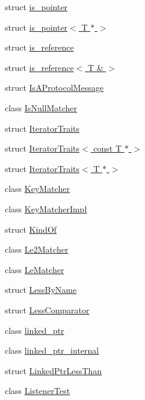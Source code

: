 \begin{DoxyCompactItemize}
struct \hyperlink{structtesting_1_1internal_1_1is__pointer}{is\+\_\+pointer}
\item 
struct \hyperlink{structtesting_1_1internal_1_1is__pointer_3_01_t_01_5_01_4}{is\+\_\+pointer$<$ T $\ast$ $>$}
\item 
struct \hyperlink{structtesting_1_1internal_1_1is__reference}{is\+\_\+reference}
\item 
struct \hyperlink{structtesting_1_1internal_1_1is__reference_3_01_t_01_6_01_4}{is\+\_\+reference$<$ T \& $>$}
\item 
struct \hyperlink{structtesting_1_1internal_1_1_is_a_protocol_message}{Is\+A\+Protocol\+Message}
\item 
class \hyperlink{classtesting_1_1internal_1_1_is_null_matcher}{Is\+Null\+Matcher}
\item 
struct \hyperlink{structtesting_1_1internal_1_1_iterator_traits}{Iterator\+Traits}
\item 
struct \hyperlink{structtesting_1_1internal_1_1_iterator_traits_3_01const_01_t_01_5_01_4}{Iterator\+Traits$<$ const T $\ast$ $>$}
\item 
struct \hyperlink{structtesting_1_1internal_1_1_iterator_traits_3_01_t_01_5_01_4}{Iterator\+Traits$<$ T $\ast$ $>$}
\item 
class \hyperlink{classtesting_1_1internal_1_1_key_matcher}{Key\+Matcher}
\item 
class \hyperlink{classtesting_1_1internal_1_1_key_matcher_impl}{Key\+Matcher\+Impl}
\item 
struct \hyperlink{structtesting_1_1internal_1_1_kind_of}{Kind\+Of}
\item 
class \hyperlink{classtesting_1_1internal_1_1_le2_matcher}{Le2\+Matcher}
\item 
class \hyperlink{classtesting_1_1internal_1_1_le_matcher}{Le\+Matcher}
\item 
struct \hyperlink{structtesting_1_1internal_1_1_less_by_name}{Less\+By\+Name}
\item 
struct \hyperlink{structtesting_1_1internal_1_1_less_comparator}{Less\+Comparator}
\item 
class \hyperlink{classtesting_1_1internal_1_1linked__ptr}{linked\+\_\+ptr}
\item 
class \hyperlink{classtesting_1_1internal_1_1linked__ptr__internal}{linked\+\_\+ptr\+\_\+internal}
\item 
struct \hyperlink{structtesting_1_1internal_1_1_linked_ptr_less_than}{Linked\+Ptr\+Less\+Than}
\item 
class \hyperlink{classtesting_1_1internal_1_1_listener_test}{Listener\+Test}

\end{DoxyCompactItemize}
